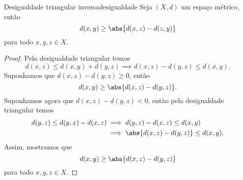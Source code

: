 \begin{lemma}{Desigualdade triangular inversa}{desigualdade}
    Seja \((X,d)\) um espaço métrico, então
    \begin{equation*}
        d(x,y) \geq \abs{d(x,z) - d(z,y)}
    \end{equation*}
    para todo \(x,y,z \in X\).
\end{lemma}
\begin{proof}
    Pela desigualdade triangular temos
    \begin{equation*}
        d(x,z) \leq d(x,y) + d(y,z) \implies d(x,z) - d(y,z) \leq d(x,y).
    \end{equation*}
    Suponhamos que \(d(x,z) - d(y,z) \geq 0\), então
    \begin{equation*}
        d(x,y) \geq \abs{d(x,z) - d(y,z)}.
    \end{equation*}
    Suponhamos agora que \(d(x,z) - d(y,z) < 0\), então pela desigualdade triangular temos
    \begin{align*}
        d(y,z) \leq d(y,x) - d(x,z) &\implies d(y,z) - d(x,z) \leq d(x,y)\\
                                    &\implies \abs{d(x,z) - d(y,z)} \leq d(x,y).
    \end{align*}
    Assim, mostramos que
    \begin{equation*}
        d(x,y) \geq \abs{d(x,z) - d(y,z)}
    \end{equation*}
    para todo \(x,y,z \in X\).
\end{proof}

